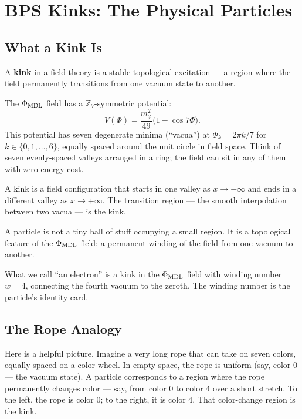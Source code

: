\documentclass[11pt,a4paper]{article}
\newcommand{\term}[1]{\textbf{#1}}
\newcommand{\PhiMDL}{\Phi_{\rm MDL}}
\newcommand{\ZS}{\mathbb{Z}_7}
\theoremstyle{definition}
\begin{document}
\section{BPS Kinks: The Physical Particles}
\label{sec:kinks}

\subsection{What a Kink Is}

A \term{kink} in a field theory is a stable topological excitation --- a region
where the field permanently transitions from one vacuum state to another.

The $\PhiMDL$ field has a $\ZS$-symmetric potential:
\[
  V(\Phi) = \frac{m_\varphi^2}{49}\bigl(1 - \cos 7\Phi\bigr).
\]
This potential has seven degenerate minima (``vacua'') at
$\Phi_k = 2\pi k/7$ for $k \in \{0,1,\ldots,6\}$, equally spaced around the
unit circle in field space.
Think of seven evenly-spaced valleys arranged in a ring; the field can sit
in any of them with zero energy cost.

A kink is a field configuration that starts in one valley as $x \to -\infty$
and ends in a different valley as $x \to +\infty$.  The transition region ---
the smooth interpolation between two vacua --- is the kink.

\begin{tcolorbox}[colback=boxgreen,colframe=green!50!black,title=Particles as topology]
A particle is not a tiny ball of stuff occupying a small region.
It is a topological feature of the $\PhiMDL$ field: a permanent winding of
the field from one vacuum to another.

What we call ``an electron'' is a kink in the $\PhiMDL$ field with
winding number $w = 4$, connecting the fourth vacuum to the zeroth.
The winding number is the particle's identity card.
\end{tcolorbox}

\subsection{The Rope Analogy}

Here is a helpful picture.  Imagine a very long rope that can take on seven
colors, equally spaced on a color wheel.  In empty space, the rope is uniform
(say, color 0 --- the vacuum state).  A particle corresponds to a region where
the rope permanently changes color --- say, from color 0 to color 4 over a
short stretch.  To the left, the rope is color 0; to the right, it is color 4.
That color-change region is the kink.
\end{document}
